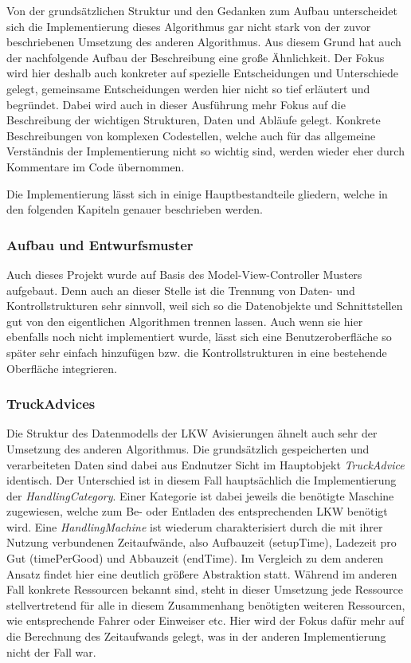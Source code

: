 Von der grundsätzlichen Struktur und den Gedanken zum Aufbau unterscheidet sich die Implementierung dieses Algorithmus gar nicht stark von der zuvor beschriebenen Umsetzung des anderen Algorithmus. Aus diesem Grund hat auch der nachfolgende Aufbau der Beschreibung eine große Ähnlichkeit. Der Fokus wird hier deshalb auch konkreter auf spezielle Entscheidungen und Unterschiede gelegt, gemeinsame Entscheidungen werden hier nicht so tief erläutert und begründet. Dabei wird auch in dieser Ausführung mehr Fokus auf die Beschreibung der wichtigen Strukturen, Daten und Abläufe gelegt. Konkrete Beschreibungen von komplexen Codestellen, welche auch für das allgemeine Verständnis der Implementierung nicht so wichtig sind, werden wieder eher durch Kommentare im Code übernommen.

Die Implementierung lässt sich in einige Hauptbestandteile gliedern, welche in den folgenden Kapiteln genauer beschrieben werden.


\subsubsection{Aufbau und Entwurfsmuster}

Auch dieses Projekt wurde auf Basis des Model-View-Controller Musters aufgebaut. Denn auch an dieser Stelle ist die Trennung von Daten- und Kontrollstrukturen sehr sinnvoll, weil sich so die Datenobjekte und Schnittstellen gut von den eigentlichen Algorithmen trennen lassen. Auch wenn sie hier ebenfalls noch nicht implementiert wurde, lässt sich eine Benutzeroberfläche so später sehr einfach hinzufügen bzw. die Kontrollstrukturen in eine bestehende Oberfläche integrieren. 


\subsubsection{TruckAdvices}

Die Struktur des Datenmodells der LKW Avisierungen ähnelt auch sehr der Umsetzung des anderen Algorithmus. Die grundsätzlich gespeicherten und verarbeiteten Daten sind dabei aus Endnutzer Sicht im Hauptobjekt \textit{TruckAdvice} identisch. Der Unterschied ist in diesem Fall hauptsächlich die Implementierung der \textit{HandlingCategory}. Einer Kategorie ist dabei jeweils die benötigte Maschine zugewiesen, welche zum Be- oder Entladen des entsprechenden LKW benötigt wird. Eine \textit{HandlingMachine} ist wiederum charakterisiert durch die mit ihrer Nutzung verbundenen Zeitaufwände, also Aufbauzeit (setupTime), Ladezeit pro Gut (timePerGood) und Abbauzeit (endTime). Im Vergleich zu dem anderen Ansatz findet hier eine deutlich größere Abstraktion statt. Während im anderen Fall konkrete Ressourcen bekannt sind, steht in dieser Umsetzung jede Ressource stellvertretend für alle in diesem Zusammenhang benötigten weiteren Ressourcen, wie entsprechende Fahrer oder Einweiser etc. Hier wird der Fokus dafür mehr auf die Berechnung des Zeitaufwands gelegt, was in der anderen Implementierung nicht der Fall war. 

